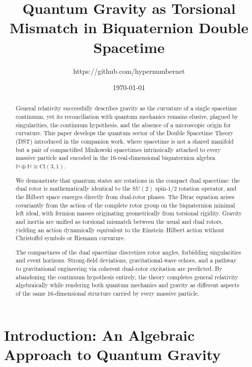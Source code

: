 \documentclass[dvipdfmx,11pt,a4paper]{article}
\title{Quantum Gravity as Torsional Mismatch in Biquaternion Double Spacetime}
\author{https://github.com/hypernumbernet}
\date{\today}
\begin{document}
\maketitle

\begin{abstract}
General relativity successfully describes gravity as the curvature of a single spacetime continuum, yet its reconciliation with quantum mechanics remains elusive, plagued by singularities, the continuum hypothesis, and the absence of a microscopic origin for curvature. This paper develops the quantum sector of the Double Spacetime Theory (DST) introduced in the companion work, where spacetime is not a shared manifold but a pair of compactified Minkowski spacetimes intrinsically attached to every massive particle and encoded in the 16-real-dimensional biquaternion algebra $\mathbb{H} \oplus \mathbb{H} \cong \mathrm{Cl}(3,1)$.

We demonstrate that quantum states are rotations in the compact dual spacetime: the dual rotor is mathematically identical to the $\mathrm{SU}(2)$ spin-1/2 rotation operator, and the Hilbert space emerges directly from dual-rotor phases. The Dirac equation arises covariantly from the action of the complete rotor group on the biquaternion minimal left ideal, with fermion masses originating geometrically from torsional rigidity. Gravity and inertia are unified as torsional mismatch between the usual and dual rotors, yielding an action dynamically equivalent to the Einstein--Hilbert action without Christoffel symbols or Riemann curvature.

The compactness of the dual spacetime discretizes rotor angles, forbidding singularities and event horizons. Strong-field deviations, gravitational-wave echoes, and a pathway to gravitational engineering via coherent dual-rotor excitation are predicted. By abandoning the continuum hypothesis entirely, the theory completes general relativity algebraically while rendering both quantum mechanics and gravity as different aspects of the same 16-dimensional structure carried by every massive particle.
\end{abstract}

\section{Introduction: An Algebraic Approach to Quantum Gravity}
\end{document}

